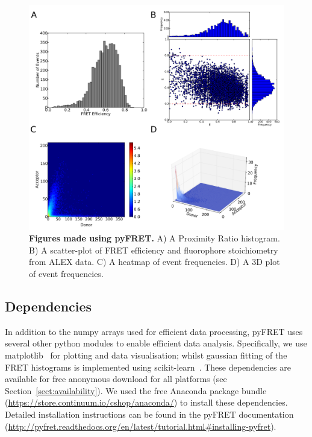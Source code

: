 \begin{figure}[!ht]
   \begin{center}
      \includegraphics*[clip=true, width=6in]{pyFRET/6bp_example.pdf}
      \caption{{\bf Figures made using pyFRET.} A) A Proximity Ratio histogram. B) A scatter-plot of FRET efficiency and fluorophore stoichiometry from ALEX data. C) A heatmap of event frequencies.  D) A 3D plot of event frequencies.}
      \label{fig:fig3_sample_results}
   \end{center}
\end{figure}

\subsection{Dependencies}
In addition to the numpy arrays used for efficient data processing, pyFRET uses several other python modules to enable efficient data analysis. Specifically, we use matplotlib~\cite{Hunter2007} for plotting and data visualisation; whilst gaussian fitting of the FRET histograms is implemented using scikit-learn~\cite{scikit-learn}. These dependencies are available for free anonymous download for all platforms (see Section~\ref{sect:availability}). We used the free Anaconda package bundle (\url{https://store.continuum.io/cshop/anaconda/}) to install these dependencies. Detailed installation instructions can be found in the pyFRET documentation (\url{http://pyfret.readthedocs.org/en/latest/tutorial.html#installing-pyfret}).

